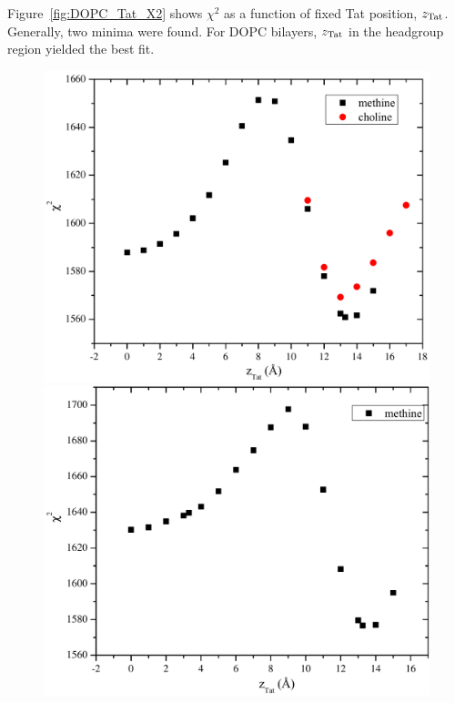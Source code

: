 Figure~\ref{fig:DOPC_Tat_X2} shows $\chi^2$ as a function of fixed Tat position, 
$z_\textrm{Tat}$. Generally, two minima were found. For DOPC bilayers, $z_\textrm{Tat}$ in the 
headgroup region yielded the best fit.
\begin{figure}[htbp]
  \centering
  \includegraphics[scale=0.3]{./figures/Tat/SDP_Results/DOPC_Tat_62to1_X2} 
  \includegraphics[scale=0.3]{./figures/Tat/SDP_Results/DOPC_Tat_28to1_X2} 

\end{figure}
